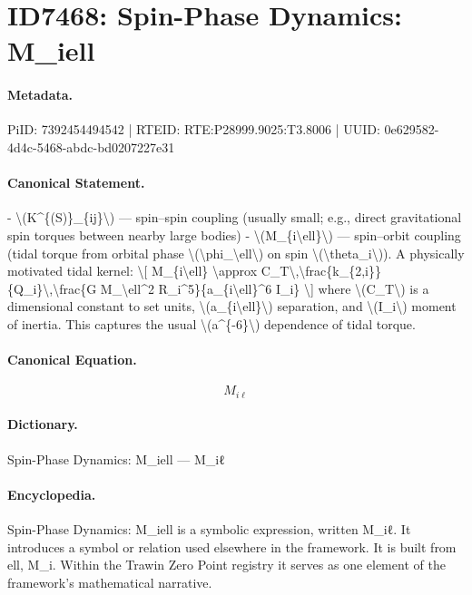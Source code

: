 \section*{ID7468: Spin-Phase Dynamics: M\_iell}
\paragraph{Metadata.}
PiID: 7392454494542 | RTEID: RTE:P28999.9025:T3.8006 | UUID: 0e629582-4d4c-5468-abdc-bd0207227e31

\paragraph{Canonical Statement.}
- \textbackslash{}(K\textasciicircum{}\{(S)\}\_\{ij\}\textbackslash{}) — spin–spin coupling (usually small; e.g., direct gravitational spin torques between nearby large bodies) - \textbackslash{}(M\_\{i\textbackslash{}ell\}\textbackslash{}) — spin–orbit coupling (tidal torque from orbital phase \textbackslash{}(\textbackslash{}phi\_\textbackslash{}ell\textbackslash{}) on spin \textbackslash{}(\textbackslash{}theta\_i\textbackslash{})). A physically motivated tidal kernel: \textbackslash{}[ M\_\{i\textbackslash{}ell\} \textbackslash{}approx C\_T\textbackslash{},\textbackslash{}frac\{k\_\{2,i\}\}\{Q\_i\}\textbackslash{},\textbackslash{}frac\{G M\_\textbackslash{}ell\textasciicircum{}2 R\_i\textasciicircum{}5\}\{a\_\{i\textbackslash{}ell\}\textasciicircum{}6 I\_i\} \textbackslash{}] where \textbackslash{}(C\_T\textbackslash{}) is a dimensional constant to set units, \textbackslash{}(a\_\{i\textbackslash{}ell\}\textbackslash{}) separation, and \textbackslash{}(I\_i\textbackslash{}) moment of inertia. This captures the usual \textbackslash{}(a\textasciicircum{}\{-6\}\textbackslash{}) dependence of tidal torque.

\paragraph{Canonical Equation.}
\[
M_{i\ell}
\]

\paragraph{Dictionary.}
Spin-Phase Dynamics: M\_iell — M\_iℓ

\paragraph{Encyclopedia.}
Spin-Phase Dynamics: M\_iell is a symbolic expression, written M\_iℓ. It introduces a symbol or relation used elsewhere in the framework. It is built from ell, M\_i. Within the Trawin Zero Point registry it serves as one element of the framework's mathematical narrative.
